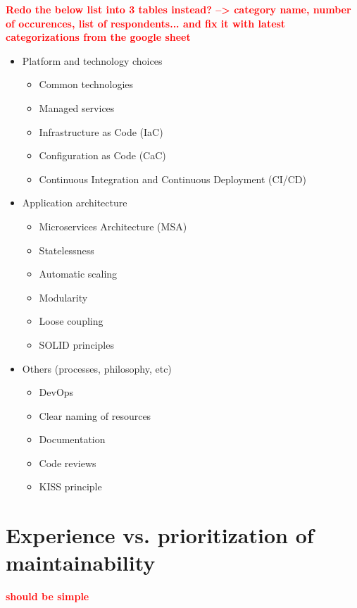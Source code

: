 \documentclass[utf8,english]{gradu3}
\newcommand{\todo}[1]{\textbf{\textcolor{red}{#1}}}
\begin{document}
\todo{%
  Redo the below list into 3 tables instead? --> category name, number of occurences, list of respondents...
}
\todo{and fix it with latest categorizations from the google sheet}

\begin{itemize}
  \item Platform and technology choices
        \begin{itemize}
          \item Common technologies
          \item Managed services
          \item Infrastructure as Code (IaC)
          \item Configuration as Code (CaC)
          \item Continuous Integration and Continuous Deployment (CI/CD)
        \end{itemize}
  \item Application architecture
        \begin{itemize}
          \item Microservices Architecture (MSA)
          \item Statelessness
          \item Automatic scaling
          \item Modularity
          \item Loose coupling
          \item SOLID principles
        \end{itemize}
  \item Others (processes, philosophy, etc)
        \begin{itemize}
          \item DevOps
          \item Clear naming of resources
          \item Documentation
          \item Code reviews
          \item KISS principle
        \end{itemize}
\end{itemize}

\section{Experience vs. prioritization of maintainability}

\todo{should be simple}

\end{document}
